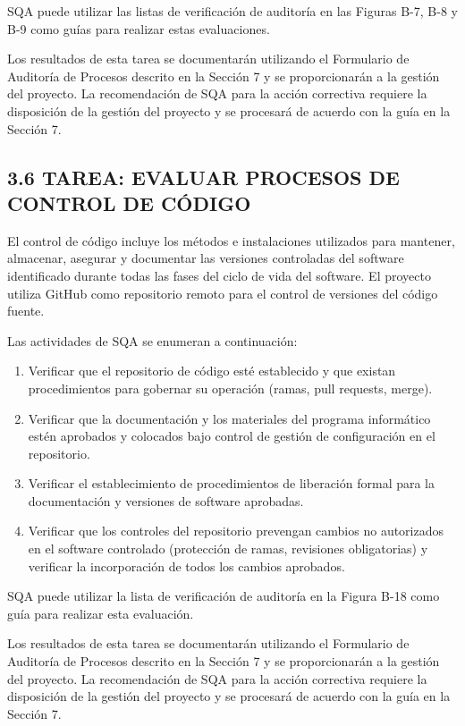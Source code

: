 SQA puede utilizar las listas de verificación de auditoría en las Figuras B-7, B-8 y B-9 como guías para realizar estas evaluaciones.

Los resultados de esta tarea se documentarán utilizando el Formulario de Auditoría de Procesos descrito en la Sección 7 y se proporcionarán a la gestión del proyecto. La recomendación de SQA para la acción correctiva requiere la disposición de la gestión del proyecto y se procesará de acuerdo con la guía en la Sección 7.

\subsection{3.6 TAREA: EVALUAR PROCESOS DE CONTROL DE CÓDIGO}
El control de código incluye los métodos e instalaciones utilizados para mantener, almacenar, asegurar y documentar las versiones controladas del software identificado durante todas las fases del ciclo de vida del software. El proyecto utiliza GitHub como repositorio remoto para el control de versiones del código fuente.

Las actividades de SQA se enumeran a continuación:
\begin{enumerate}
    \item Verificar que el repositorio de código esté establecido y que existan procedimientos para gobernar su operación (ramas, pull requests, merge).
    \item Verificar que la documentación y los materiales del programa informático estén aprobados y colocados bajo control de gestión de configuración en el repositorio.
    \item Verificar el establecimiento de procedimientos de liberación formal para la documentación y versiones de software aprobadas.
    \item Verificar que los controles del repositorio prevengan cambios no autorizados en el software controlado (protección de ramas, revisiones obligatorias) y verificar la incorporación de todos los cambios aprobados.
\end{enumerate}

SQA puede utilizar la lista de verificación de auditoría en la Figura B-18 como guía para realizar esta evaluación.

Los resultados de esta tarea se documentarán utilizando el Formulario de Auditoría de Procesos descrito en la Sección 7 y se proporcionarán a la gestión del proyecto. La recomendación de SQA para la acción correctiva requiere la disposición de la gestión del proyecto y se procesará de acuerdo con la guía en la Sección 7.

